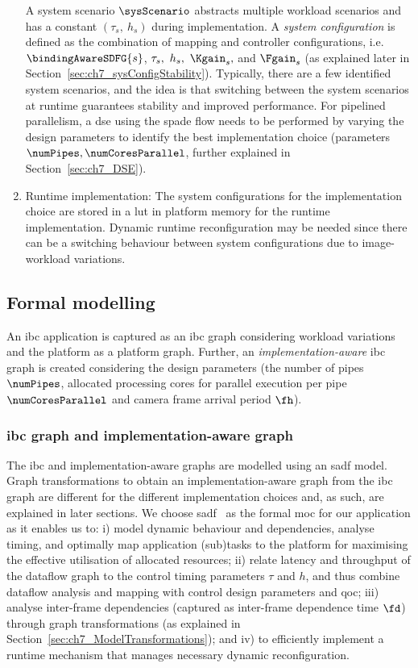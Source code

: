 \begin{enumerate}
    A system scenario $\sysScenario$ abstracts multiple workload scenarios and has a constant $(\tau_s,\ h_s)$ during implementation. A \emph{system configuration} is defined as the combination of mapping and controller configurations, i.e. $\bindingAwareSDFG{s}$, $\tau_s,\ h_s,\ \Kgain_s,$ and $\Fgain_s$ (as explained later in Section~\ref{sec:ch7_sysConfigStability}).
    Typically, there are a few identified system scenarios, and the idea is that switching between the system scenarios at runtime guarantees stability and improved performance.
    For pipelined parallelism, a \gls{dse} using the \gls{spade} flow needs to be performed by varying the design parameters to identify the best implementation choice (parameters $\numPipes, \numCoresParallel$, further explained in Section~\ref{sec:ch7_DSE}).
    \item Runtime implementation: The system configurations for the implementation choice are stored in a \gls{lut} in platform memory for the runtime implementation. Dynamic runtime reconfiguration may be needed since there can be a switching behaviour between system configurations due to image-workload variations.
\end{enumerate}

\subsection{Formal modelling}
An \gls{ibc} application is captured as an \gls{ibc} graph considering workload variations and the platform as a platform graph. 
Further, an \emph{implementation-aware} \gls{ibc} graph is created considering the design parameters (the number of pipes $\numPipes$, allocated processing cores for parallel execution per pipe $\numCoresParallel$ and camera frame arrival period $\fh$).

\subsubsection{\Gls{ibc} graph and implementation-aware graph}
\label{sec:ch7_IBCGraph}
The \gls{ibc} and implementation-aware graphs are modelled using an \gls{sadf} model.
Graph transformations to obtain an implementation-aware graph from the \gls{ibc} graph are different for the different implementation choices and, as such, are explained in later sections.
We choose \gls{sadf}~\cite{theelen2006scenario} as the formal \gls{moc} for our application as it enables us to: i) model dynamic behaviour and dependencies, analyse timing, and optimally map application (sub)tasks to the platform for maximising the effective utilisation of allocated resources; 
ii) relate latency and throughput of the dataflow graph to the control timing parameters $\tau$ and $h$, and thus combine dataflow analysis and mapping with control design parameters and \gls{qoc}; 
iii) analyse inter-frame dependencies (captured as inter-frame dependence time $\fd$) through graph transformations (as explained in Section~\ref{sec:ch7_ModelTransformations});
and iv) to efficiently implement a runtime mechanism that manages necessary dynamic reconfiguration.

